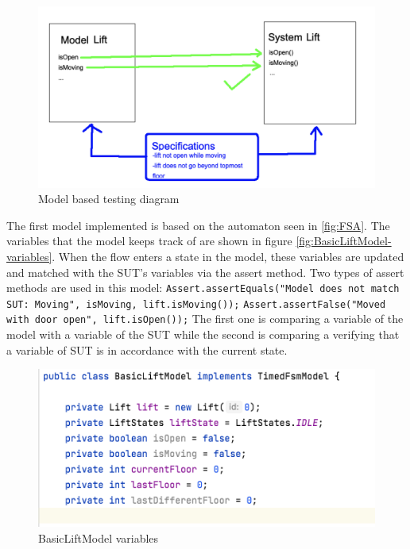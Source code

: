 \documentclass[a4paper, 12pt]{article}
\begin{document}
\begin{figure}[h]
   \centering
   \includegraphics[width=\textwidth,height=\textheight,keepaspectratio]{images/model-based-testing-diag} %
   \caption{Model based testing diagram}
   \label{fig:model-based-testing-diag}
\end{figure}

The first model implemented is based on the automaton seen in \ref{fig:FSA}. The variables that the model keeps track of are shown in figure \ref{fig:BasicLiftModel-variables}. When the flow enters a state in the model, these variables are updated and matched with the SUT's variables via the assert method. Two types of assert methods are used in this model: \newline
\texttt{Assert.assertEquals("Model does not match SUT: Moving", isMoving, lift.isMoving());} \newline
\texttt{Assert.assertFalse("Moved with door open", lift.isOpen());}
The first one is comparing a variable of the model with a variable of the SUT while the second is comparing a verifying that a variable of SUT is in accordance with the current state.\\ 

\begin{figure}[h]
   \centering
   \includegraphics[width=\textwidth,height=\textheight,keepaspectratio]{images/BasicLiftModel-variables} %
   \caption{BasicLiftModel variables}
   \label{fig:BasicLiftModel-variablesl}
\end{figure}
\end{document}
